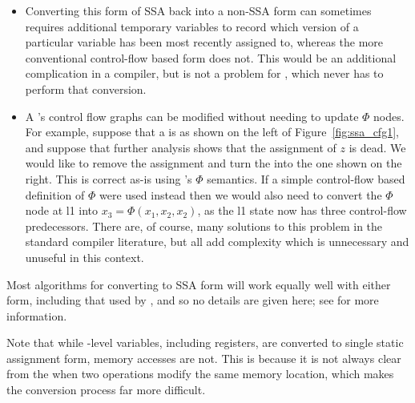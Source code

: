 \begin{itemize}
\item
  Converting this form of SSA back into a non-SSA form can sometimes
  requires additional temporary variables to record which version of a
  particular variable has been most recently assigned to, whereas the
  more conventional control-flow based form does not.  This would be
  an additional complication in a compiler, but is not a problem for
  {\technique}, which never has to perform that conversion.
\item
  A {\StateMachine}'s control flow graphs can be modified without
  needing to update $\Phi$ nodes.  For example, suppose that a
  {\StateMachine} is as shown on the left of
  Figure~\ref{fig:ssa_cfg1}, and suppose that further analysis shows
  that the assignment of $z$ is dead.  We would like to remove the
  assignment and turn the {\StateMachine} into the one shown on the
  right.  This is correct as-is using {\technique}'s $\Phi$ semantics.
  If a simple control-flow based definition of $\Phi$ were used
  instead then we would also need to convert the $\Phi$ node at l1
  into $x_3 = \Phi(x_1, x_2, x_2)$, as the l1 state now has three
  control-flow predecessors.  There are, of course, many solutions to
  this problem in the standard compiler literature\needCite{}, but all
  add complexity which is unnecessary and unuseful in this context.
\end{itemize}

Most algorithms for converting to SSA form will work equally well with
either form, including that used by \implementation, and so no details
are given here; see \needCite{} for more information.


Note that while {\StateMachine}-level variables, including registers,
are converted to single static assignment form, memory accesses are
not.  This is because it is not always clear from the {\StateMachine}
when two  operations modify the same memory location,
which makes the conversion process far more difficult.  



